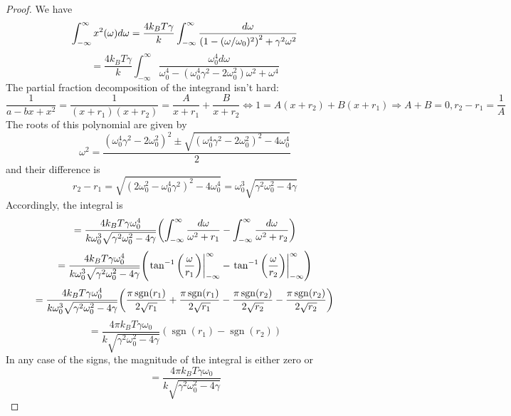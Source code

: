 \documentclass{article}
\DeclareMathOperator{\sgn}{sgn}
\begin{document}
\begin{proof}
  We have
  \[
    \int_{-\infty}^{\infty}x^{2}(\omega)d\omega
    = \frac{4k_{B}T\gamma}{k}\int_{-\infty}^{\infty}\frac{d\omega}{\qty(1-(\omega/\omega_{0})^{2})^{2}+\gamma^{2}\omega^{2}}
  \]
  \[
    = \frac{4k_{B}T\gamma}{k}\int_{-\infty}^{\infty}\frac{\omega_{0}^{4}d\omega}{\omega_{0}^{4}
      - (\omega_{0}^{4}\gamma^{2}-2\omega_{0}^{2})\omega^{2} + \omega^{4}}
  \]
  The partial fraction decomposition of the integrand isn't hard:
  \[
    \frac{1}{a-bx+x^{2}} = \frac{1}{(x + r_{1})(x + r_{2})} = \frac{A}{x + r_{1}} + \frac{B}{x + r_{2}}
    \Leftrightarrow 1 = A(x+r_{2}) + B(x + r_{1}) \Rightarrow A+B = 0, r_{2}-r_{1} = \frac{1}{A}
  \]
  The roots of this polynomial are given by
  \[
    \omega^{2} = \frac{(\omega_{0}^{4}\gamma^{2} - 2\omega_{0}^{2})^{2} \pm \sqrt{(\omega_{0}^{4}\gamma^{2}-2\omega_{0}^{2})^{2}
        - 4\omega_{0}^{4}}}{2}
  \]
  and their difference is
  \[
    r_{2} - r_{1} =\sqrt{(2\omega_{0}^{2}-\omega_{0}^{4}\gamma^{2})^{2} - 4\omega_{0}^{4}} = \omega_{0}^{3}\sqrt{\gamma^{2}\omega_{0}^{2}-4\gamma}
  \]
  Accordingly, the integral is
  \[
    = \frac{4k_{B}T\gamma\omega_{0}^{4}}{k\omega_{0}^{3}\sqrt{\gamma^{2}\omega_{0}^{2}-4\gamma}}
    \qty(\int_{-\infty}^{\infty}\frac{d\omega}{\omega^{2} + r_{1}}
    - \int_{-\infty}^{\infty}\frac{d\omega}{\omega^{2} + r_{2}})
  \]
  \[
    = \frac{4k_{B}T\gamma\omega_{0}^{4}}{k\omega_{0}^{3}\sqrt{\gamma^{2}\omega_{0}^{2}-4\gamma}}
    \qty(\eval{\tan^{-1}\qty(\frac{\omega}{r_{1}})}_{-\infty}^{\infty} - \eval{\tan^{-1}\qty(\frac{\omega}{r_{2}})}_{-\infty}^{\infty})
  \]
  \[
    = \frac{4k_{B}T\gamma\omega_{0}^{4}}{k\omega_{0}^{3}\sqrt{\gamma^{2}\omega_{0}^{2}-4\gamma}}
    \qty(\frac{\pi\sgn(r_{1})}{2\sqrt{r_{1}}}+\frac{\pi\sgn(r_{1})}{2\sqrt{r_{1}}}
    - \frac{\pi\sgn(r_{2})}{2\sqrt{r_{2}}} - \frac{\pi\sgn(r_{2})}{2\sqrt{r_{2}}})
  \]
  \[
    = \frac{4\pi k_{B}T\gamma\omega_{0}}{k\sqrt{\gamma^{2}\omega_{0}^{2}-4\gamma}}
    (\sgn(r_{1}) - \sgn(r_{2}))
  \]
  In any case of the signs, the magnitude of the integral is either zero or
  \[
    = \frac{4\pi k_{B}T\gamma\omega_{0}}{k\sqrt{\gamma^{2}\omega_{0}^{2}-4\gamma}}
  \]
\end{proof}
\end{document}

